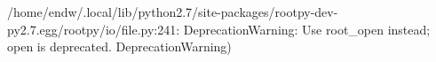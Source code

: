 \begin{footnotesize}
\begin{pyglist}[language=text,texcl=true,abovecaptionskip=0,style=bw]
/home/endw/.local/lib/python2.7/site-packages/rootpy-dev-py2.7.egg/rootpy/io/file.py:241: DeprecationWarning: Use root_open instead; open is deprecated.
  DeprecationWarning)
\end{pyglist}
\end{footnotesize}
